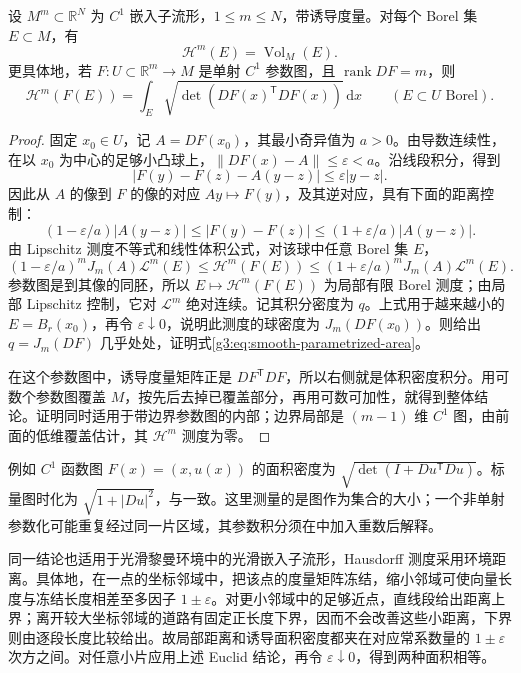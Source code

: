 \begin{theorem}\label{g3:thm:smooth-hausdorff-area}
	设 \(M^m\subset\mathbb R^N\) 为 \(C^1\) 嵌入子流形，\(1\le m\le N\)，带诱导度量。对每个 Borel 集 \(E\subset M\)，有
	\[
		\mathcal H^m(E)=\operatorname{Vol}_M(E).
	\]
	更具体地，若 \(F:U\subset\mathbb R^m\to M\) 是单射 \(C^1\) 参数图，且 \(\operatorname{rank}DF=m\)，则
	\begin{equation}\label{g3:eq:smooth-parametrized-area}
		\mathcal H^m(F(E))
		=\int_E\sqrt{\det(DF(x)^{\mathsf T}DF(x))}\,\mathrm dx
		\qquad(E\subset U\text{ Borel}).
	\end{equation}
\end{theorem}
\begin{proof}
	固定 \(x_0\in U\)，记 \(A=DF(x_0)\)，其最小奇异值为 \(a>0\)。由导数连续性，在以 \(x_0\) 为中心的足够小凸球上，\(\|DF(x)-A\|\le\varepsilon<a\)。沿线段积分，得到
	\[
		|F(y)-F(z)-A(y-z)|\le\varepsilon|y-z|.
	\]
	因此从 \(A\) 的像到 \(F\) 的像的对应 \(Ay\mapsto F(y)\)，及其逆对应，具有下面的距离控制：
	\[
		(1-\varepsilon/a)|A(y-z)|
		\le |F(y)-F(z)|
		\le(1+\varepsilon/a)|A(y-z)|.
	\]
	由 Lipschitz 测度不等式和线性体积公式，对该球中任意 Borel 集 \(E\)，
	\[
		(1-\varepsilon/a)^m J_m(A)\mathcal L^m(E)
		\le\mathcal H^m(F(E))
		\le(1+\varepsilon/a)^m J_m(A)\mathcal L^m(E).
	\]
	参数图是到其像的同胚，所以 \(E\mapsto\mathcal H^m(F(E))\) 为局部有限 Borel 测度；由局部 Lipschitz 控制，它对 \(\mathcal L^m\) 绝对连续。记其积分密度为 \(q\)。上式用于越来越小的 \(E=B_r(x_0)\)，再令 \(\varepsilon\downarrow0\)，说明此测度的球密度为 \(J_m(DF(x_0))\)。则给出 \(q=J_m(DF)\) 几乎处处，证明式\eqref{g3:eq:smooth-parametrized-area}。

	在这个参数图中，诱导度量矩阵正是 \(DF^{\mathsf T}DF\)，所以右侧就是体积密度积分。用可数个参数图覆盖 \(M\)，按先后去掉已覆盖部分，再用可数可加性，就得到整体结论。证明同时适用于带边界参数图的内部；边界局部是 \((m-1)\) 维 \(C^1\) 图，由前面的低维覆盖估计，其 \(\mathcal H^m\) 测度为零。
\end{proof}

例如 \(C^1\) 函数图 \(F(x)=(x,u(x))\) 的面积密度为
\(\sqrt{\det(I+Du^{\mathsf T}Du)}\)。标量图时化为
\(\sqrt{1+|Du|^2}\)，与一致。这里测量的是图作为集合的大小；一个非单射参数化可能重复经过同一片区域，其参数积分须在中加入重数后解释。

\ProseParagraphBreak

同一结论也适用于光滑黎曼环境中的光滑嵌入子流形，Hausdorff 测度采用环境距离。具体地，在一点的坐标邻域中，把该点的度量矩阵冻结，缩小邻域可使向量长度与冻结长度相差至多因子 \(1\pm\varepsilon\)。对更小邻域中的足够近点，直线段给出距离上界；离开较大坐标邻域的道路有固定正长度下界，因而不会改善这些小距离，下界则由逐段长度比较给出。故局部距离和诱导面积密度都夹在对应常系数量的 \(1\pm\varepsilon\) 次方之间。对任意小片应用上述 Euclid 结论，再令 \(\varepsilon\downarrow0\)，得到两种面积相等。
